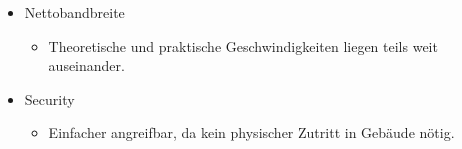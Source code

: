 \begin{itemize}
\begin{itemize}
\begin{itemize}
        \end{itemize}
        \item Nettobandbreite
        \begin{itemize}
            \item Theoretische und praktische Geschwindigkeiten liegen teils weit auseinander.
        \end{itemize}
        \item Security
        \begin{itemize}
            \item Einfacher angreifbar, da kein physischer Zutritt in Gebäude nötig.
        \end{itemize}
    \end{itemize}
\end{itemize}
